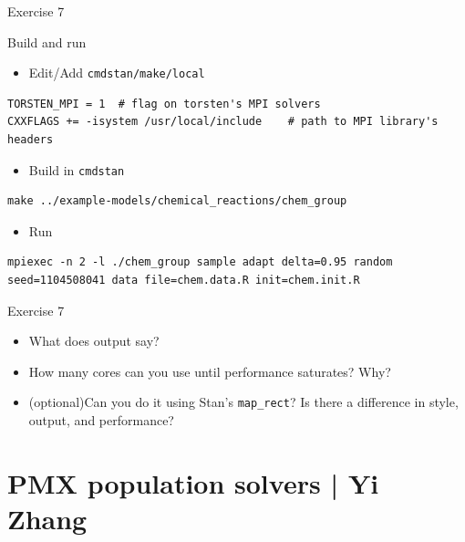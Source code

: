 \documentclass[presentation, allowframebreaks]{beamer}
\begin{document}
\begin{frame}[fragile,label={sec:org947ec52}]{Exercise 7}
 \begin{block}{Build and run}
\begin{itemize}
\item Edit/Add \texttt{cmdstan/make/local}
\end{itemize}
\begin{verbatim}
TORSTEN_MPI = 1  # flag on torsten's MPI solvers
CXXFLAGS += -isystem /usr/local/include    # path to MPI library's headers
\end{verbatim}
\begin{itemize}
\item Build in \texttt{cmdstan}
\end{itemize}
\begin{verbatim}
make ../example-models/chemical_reactions/chem_group
\end{verbatim}
\begin{itemize}
\item Run
\end{itemize}
\begin{verbatim}
mpiexec -n 2 -l ./chem_group sample adapt delta=0.95 random seed=1104508041 data file=chem.data.R init=chem.init.R
\end{verbatim}
\end{block}
\end{frame}

\begin{frame}[fragile,label={sec:orgdc5fbe0}]{Exercise 7}
 \begin{itemize}
\item What does output say?
\item How many cores can you use until performance saturates? Why?
\item (optional)Can you do it using Stan's \texttt{map\_rect}? Is there a difference in style, output, and performance?
\end{itemize}
\end{frame}

\section{PMX population solvers | \footnotesize{Yi Zhang}}
\label{sec:org93466e8}
\end{document}
